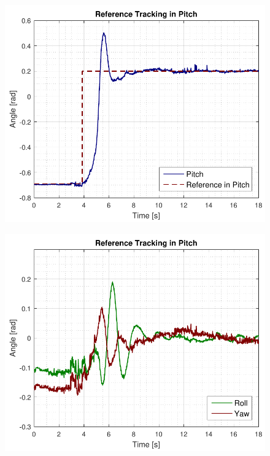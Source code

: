 \begin{minipage}{\linewidth}
    \begin{minipage}{0.46\linewidth}
        \begin{figure}[H]
            \includegraphics[scale=.5]{figures/pitchRefAccept.pdf}
            \centering			
            \label{fig:pitchRefAccept}
        \end{figure}
    \end{minipage}
    \hspace{0.03\linewidth}
    \begin{minipage}{0.46\linewidth}
        \begin{figure}[H]
            \includegraphics[scale=.5]{figures/pitchRefAcceptRollYaw.pdf}
            \centering
            \label{fig:pitchRefAcceptRollYaw}
        \end{figure}
    \end{minipage}
\end{minipage}


